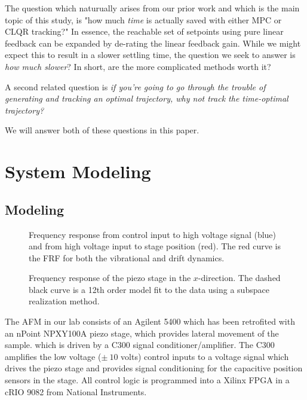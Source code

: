 \documentclass[journal,12pt,twocolumn,twoside]{IEEEtran/IEEEtran}
\begin{document}
The question which naturually arises from our prior work and which is the main topic of this study, is "how much \emph{time} is actually saved with either MPC or CLQR tracking?" In essence, the reachable set of setpoints using pure linear feedback can be expanded by de-rating the linear feedback gain. While we might expect this to result in a slower settling time, the question we seek to answer is \emph{how much slower}? In short, are the more complicated methods worth it?

A second related question is \emph{if you're going to go through the trouble of generating and tracking an optimal trajectory, why not track the time-optimal trajectory?}

We will answer both of these questions in this paper. 




\section{System Modeling}
\label{sec:orgbc45dd3}
\subsection{Modeling}
\begin{figure*}
  \centering
  \begin{minipage}{0.45\textwidth}
  
  \caption{Frequency response from control input to high voltage signal (blue) and from high voltage input to stage position (red). The red curve is the FRF for both the vibrational and drift dynamics.}
  \label{fig:powfrf}
\end{minipage}
\hfill
\begin{minipage}{0.45\textwidth}
  \centering
  
  \caption{Frequency response of the piezo stage in the $x$-direction. The dashed black curve is a 12th order model fit to the data using a subspace realization method.}
  \label{fig:frf_xdir}
\end{minipage}
\end{figure*}
The AFM in our lab consists of an Agilent 5400 which has been retrofited with an nPoint NPXY100A piezo stage, which provides lateral movement of the sample. which is driven by a C300 signal conditioner/amplifier. The C300 amplifies the low voltage ($\pm~10$ volts) control inputs to a voltage signal which drives the piezo stage and provides signal conditioning for the capacitive position sensors in the stage. All control logic is programmed into a Xilinx FPGA in a cRIO 9082 from National Instruments.
\end{document}
